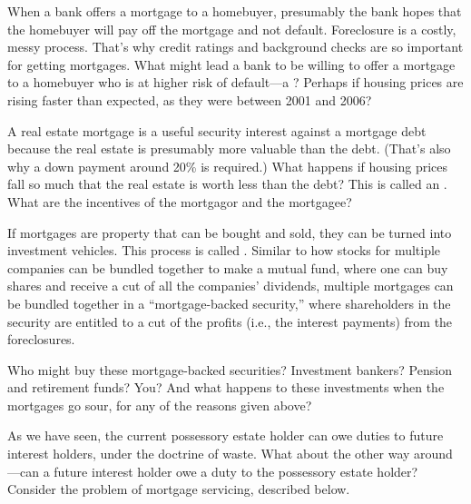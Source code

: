 \item When a bank offers a mortgage to a homebuyer, presumably the bank hopes
that the homebuyer will pay off the mortgage and not default. Foreclosure is a
costly, messy process. That's why credit ratings and background checks are so
important for getting mortgages. What might lead a bank to be willing to offer a
mortgage to a homebuyer who is at higher risk of default---a ? Perhaps if housing prices are rising faster than expected, as they
were between 2001 and 2006?

\item A real estate mortgage is a useful security interest against a mortgage
debt because the real estate is presumably more valuable than the debt. (That's
also why a down payment around 20\% is required.) What happens if housing prices
fall so much that the real estate is worth less than the debt? This is called an
. What are the incentives of the mortgagor and the
mortgagee?


\item If mortgages are property that can be bought and sold, they can be turned
into investment vehicles. This
process is called
. Similar to how
stocks for multiple companies can be bundled together to make a mutual
fund, where one can buy shares and receive a cut of all the companies'
dividends, multiple mortgages can be bundled together in a ``mortgage-backed
security,'' where shareholders in the security are entitled to a cut of the
profits (i.e., the interest payments) from the
foreclosures.

Who might buy these mortgage-backed securities? Investment bankers? Pension and
retirement funds? You? And what happens to these investments when the mortgages
go sour, for any of the reasons given above?


\item As we have seen, the current possessory estate holder can owe duties to
future interest holders, under the doctrine of waste. What about the other way
around---can a future interest holder owe a duty to the possessory estate
holder? Consider the problem of mortgage servicing, described below.



